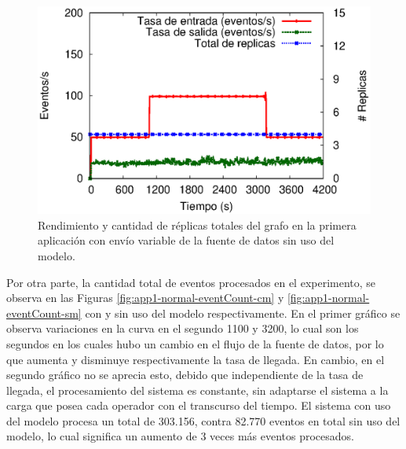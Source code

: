 \begin{figure}[!ht]
	\centering
	\includegraphics[scale=0.7]{images/exp/app1/normal/sm/processSystem.eps}
    \caption{Rendimiento y cantidad de r\'eplicas totales del grafo en la primera aplicaci\'on con env\'io variable de la fuente de datos sin uso del modelo.}
	\label{fig:app1-normal-processSystem-sm}
\end{figure}

Por otra parte, la cantidad total de eventos procesados en el experimento, se observa en las Figuras \ref{fig:app1-normal-eventCount-cm} y \ref{fig:app1-normal-eventCount-sm} con y sin uso del modelo respectivamente. En el primer gr\'afico se observa variaciones en la curva en el segundo 1100 y 3200, lo cual son los segundos en los cuales hubo un cambio en el flujo de la fuente de datos, por lo que aumenta y disminuye respectivamente la tasa de llegada. En cambio, en el segundo gr\'afico no se aprecia esto, debido que independiente de la tasa de llegada, el procesamiento del sistema es constante, sin adaptarse el sistema a la carga que posea cada operador con el transcurso del tiempo. El sistema con uso del modelo procesa un total de 303.156, contra 82.770 eventos en total sin uso del modelo, lo cual significa un aumento de 3 veces m\'as eventos procesados.

